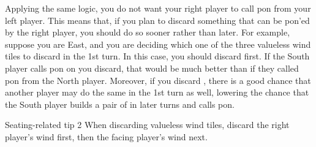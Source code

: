\bigskip
Applying the same logic, you do not want your right player to call {\jap pon} from your left player. This means that, if you plan to discard something that can be {\jap pon}'ed by the right player, you should do so sooner rather than later. For example, suppose you are East, and you are deciding which one of the three valueless wind tiles {\LARGE\nan\xi\bei} to discard in the 1st turn. In this case, you should discard {\LARGE\nan} first. If the South player calls {\jap pon} on {\LARGE\nan} you discard, that would be much better than if they called {\jap pon} from the North player. Moreover, if you discard {\LARGE\nan}, there is a good chance that another player may do the same in the 1st turn as well, lowering the chance that the South player builds a pair of {\LARGE\nan} in later turns and calls {\jap pon}. 

\begin{itembox}[c]{Seating-related tip 2}
When discarding valueless wind tiles, discard the right player's wind first, then the facing player's wind next.
\end{itembox}



